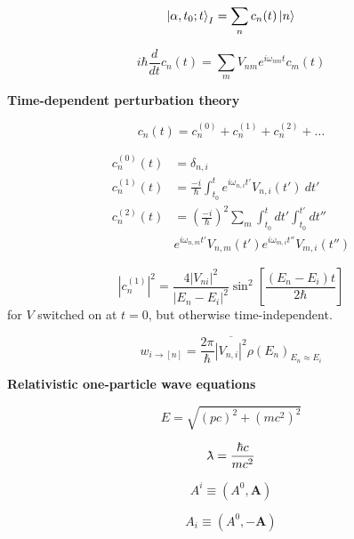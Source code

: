 \documentclass[11pt]{article}
\newcommand{\vect}[1]{\boldsymbol{\mathbf{#1}}}
\newcommand{\lambdabar}{{\mkern0.75mu\mathchar '26\mkern -9.75mu\lambda}}
\begin{document}
\begin{multicols}{2}
\begin{equation} %
\ket{\alpha,t_0;t}_I = \sum_n c_n(t) \ket{n}
\end{equation}

\begin{equation} %
i\hbar \frac{d}{dt} c_n(t)  = \sum_m V_{nm} e^{i\omega_{nm}t}c_m(t)
\end{equation}

{\bf Time-dependent perturbation theory}

\begin{equation}
c_n(t) = c_n^{(0)} + c_n^{(1)} + c_n^{(2)} + \dots
\end{equation}

\begin{align}
c_n^{(0)}(t) & = \delta_{n,i} \\
c_n^{(1)}(t) & = \frac{-i}{\hbar}
  \int_{t_0}^t e^{i\omega_{n,i}t'} V_{n,i}(t') \: dt' \\
c_n^{(2)}(t) & = \left( \frac{-i}{\hbar} \right)^2
\sum_m \int_{t_0}^{t} dt' \int_{t_0}^{t'} dt''  \nonumber \\
&
e^{i\omega_{n,m}t'} V_{n,m}(t') e^{i\omega_{m,i}t''} V_{m,i}(t'')
\end{align}


\begin{equation}
|c_n^{(1)}|^2 =
  \frac{4|V_{ni}|^2}{|E_n-E_i|^2} \sin^2
    \left [
      \frac{(E_n-E_i)t}{2\hbar}
    \right ]
\end{equation}
{\footnotesize for $V$ switched on at $t=0$, but otherwise time-independent.}

\begin{equation}
w_{i\rightarrow [n]} =
\frac{2\pi}{\hbar} \overline{|V_{n,i}|^2} \rho(E_n)_{E_n \approx E_i}
\end{equation}

{\bf Relativistic one-particle wave equations}

\begin{equation}
E = \sqrt{(pc)^2+(mc^2)^2}
\end{equation}

\begin{equation}
\lambdabar = \frac{\hbar c}{mc^2}
\end{equation}

\begin{equation}
A^i \equiv (A^0, \vect{A})
\end{equation}

\begin{equation}
A_i \equiv (A^0, -\vect{A})
\end{equation}


\end{multicols}
\end{document}
